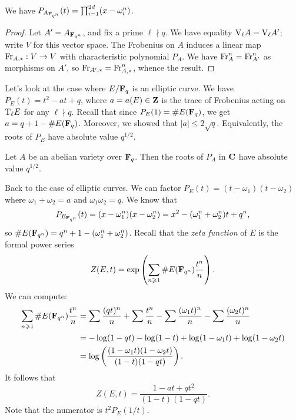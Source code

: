 \begin{theorem}\label{thm:char-poly-power}
We have $P_{A_{\mathbf{F}_{q^n}}}(t) = \prod_{i=1}^{2 d} (x-\omega_i^n)$. 
\end{theorem}
\begin{proof}
Let $A'=A_{\mathbf{F}_{q^n}}$, and fix a prime $\ell\nmid q$. We have equality 
$\mathrm{V}_\ell A = \mathrm{V}_\ell A'$; write $V$ for this vector space. The Frobenius 
on $A$ induces a linear map $\mathrm{Fr}_{A,\ast}:V\to V$ with characteristic 
polynomial $P_A$. We have $\mathrm{Fr}_A^n=\mathrm{Fr}_{A'}^n$ as morphisms on $A'$, so 
$\mathrm{Fr}_{A',\ast} = \mathrm{Fr}_{A,\ast}^n$, whence the result. 
\end{proof}

Let's look at the case where $E/\mathbf{F}_q$ is an elliptic curve. We have 
$P_E(t)=t^2-a t+q$, where $a=a(E)\in \mathbf{Z}$ is the trace of Frobenius acting on 
$\mathrm{T}_\ell E$ for any $\ell\nmid q$. Recall that since $P_E(1)=\# E(\mathbf{F}_q)$, we 
get $a=q+1-\# E(\mathbf{F}_q)$. Moreover, we showed that $|a|\leqslant 2\sqrt q$. 
Equivalently, the roots of $P_E$ have absolute value $q^{1/2}$. 

\begin{theorem}[Weil]
Let $A$ be an abelian variety over $\mathbf{F}_q$. Then the roots of $P_A$ in $\mathbf{C}$ 
have absolute value $q^{1/2}$. 
\end{theorem}

Back to the case of elliptic curves. We can factor 
$P_E(t)=(t-\omega_1)(t-\omega_2)$ where $\omega_1+\omega_2=a$ and 
$\omega_1 \omega_2 = q$. We know that 
\[
  P_{E_{\mathbf{F}_{q^n}}}(t) = (x-\omega_1^n)(x-\omega_2^n) 
    = x^2 - (\omega_1^n + \omega_2^n) t + q^n \text{,}
\]
so $\# E(\mathbf{F}_{q^n}) = q^n+1 - (\omega_1^n+\omega_2^n)$. Recall that the 
\emph{zeta function} of $E$ is the formal power series 
\[
  Z(E,t) = \exp\left(\sum_{n\geqslant 1} \# E(\mathbf{F}_{q^n}) \frac{t^n}{n} \right) \text{.}
\]
We can compute:
\begin{align*}
  \sum_{n\geqslant 1} \# E(\mathbf{F}_{q^n}) \frac{t^n}{n} 
    &= \sum \frac{(q t)^n}{n} + \sum \frac{t^n}{n} - \sum \frac{(\omega_1 t)^n}{n} - \sum \frac{(\omega_2 t)^n}{n} \\
    &= -\log(1-q t) - \log(1-t) + \log(1-\omega_1 t) + \log(1-\omega_2 t) \\
    &= \log\left(\frac{(1-\omega_1 t)(1-\omega_2 t)}{(1-t)(1-q t)} \right) \text{.}
\end{align*}
It follows that 
\[
  Z(E,t) = \frac{1-a t+q t^2}{(1-t)(1-q t)} \text{.}
\]
Note that the numerator is $t^2 P_E(1/t)$. 


